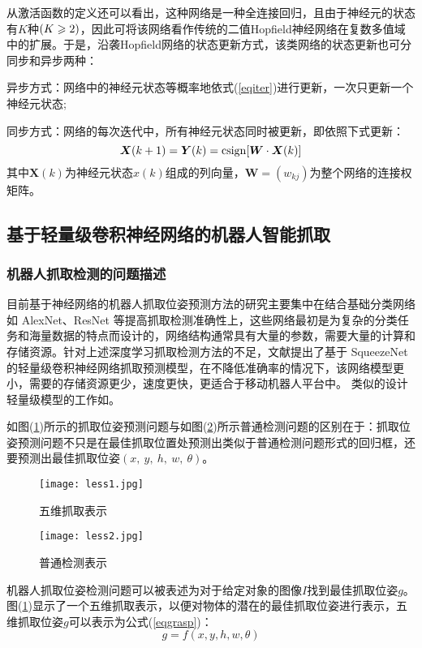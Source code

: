 \documentclass[no-math, withoutpreface]{YangThesis}
\begin{document}
从激活函数的定义还可以看出，这种网络是一种全连接回归，且由于神经元的状态有$K$种$(K\geqslant2)$，因此可将该网络看作传统的二值Hopf\/ield神经网络在复数多值域中的扩展。于是，沿袭Hopf\/ield网络的状态更新方式，该类网络的状态更新也可分同步和异步两种：

异步方式：网络中的神经元状态等概率地依式(\ref{eqiter})进行更新，一次只更新一个神经元状态;

同步方式：网络的每次迭代中，所有神经元状态同时被更新，即依照下式更新：
\begin{equation}
{\bm X}(k+1)={\bm Y}(k)=\operatorname{csign}[{\bm W }\cdot{\bm X }(k)]               
\end{equation}
其中${\bm X}(k)$为神经元状态$x(k)$组成的列向量，${\bm W}=(w_{kj})$为整个网络的连接权矩阵。

\subsection{基于轻量级卷积神经网络的机器人智能抓取}

\subsubsection{机器人抓取检测的问题描述}

目前基于神经网络的机器人抓取位姿预测方法的研究主要集中在结合基础分类网络如 AlexNet、ResNet 等提高抓取检测准确性上，这些网络最初是为复杂的分类任务和海量数据的特点而设计的，网络结构通常具有大量的参数，需要大量的计算和存储资源。针对上述深度学习抓取检测方法的不足，文献\cite{bib:one}提出了基于 SqueezeNet 的轻量级卷积神经网络抓取预测模型，在不降低准确率的情况下，该网络模型更小，需要的存储资源更少，速度更快，更适合于移动机器人平台中。 类似的设计轻量级模型的工作如\cite{bib11}。

如图(\ref{figless1})所示的抓取位姿预测问题与如图(\ref{figless2})所示普通检测问题的区别在于：抓取位姿预测问题不只是在最佳抓取位置处预测出类似于普通检测问题形式的回归框，还要预测出最佳抓取位姿$(x,\ y,\ h,\ w,\ \theta)$。

\begin{figure}[!htbp]
	\centering
	\texttt{[image: less1.jpg]}
	\caption{五维抓取表示}
     \label{figless1}
\end{figure}
\begin{figure}[!htbp]
	\centering
	\texttt{[image: less2.jpg]}
	\caption{普通检测表示}
     \label{figless2}
\end{figure}

机器人抓取位姿检测问题可以被表述为对于给定对象的图像$I$找到最佳抓取位姿$g$。图(\ref{figless1})显示了一个五维抓取表示\cite{bib3}，以便对物体的潜在的最佳抓取位姿进行表示，五维抓取位姿$g$可以表示为公式(\ref{eqgrasp})：
\begin{equation}
g=f(x,y,h,w,\theta)
\label{eqgrasp}
\end{equation}
\end{document}
